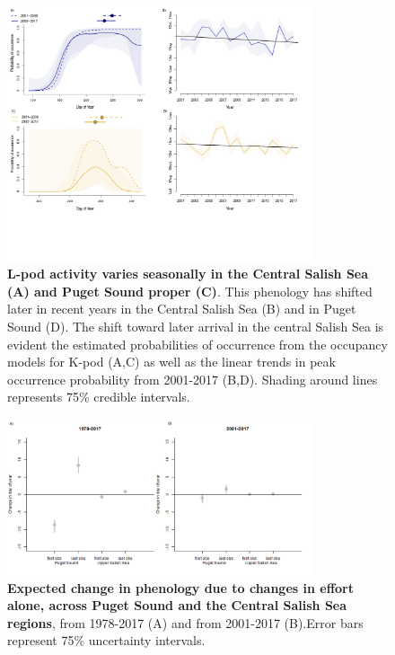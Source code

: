 \documentclass{article}
\begin{document}
\begin{figure}[ht]
\includegraphics[width=0.8\textwidth]{../analyses/figures/proboccL_4panels.png} 
\caption{\textbf{L-pod activity varies seasonally in the Central Salish Sea (A) and Puget Sound proper (C)}. This phenology has shifted later in recent years in the Central Salish Sea (B) and in Puget Sound (D). The shift toward later arrival in the central Salish Sea is evident the estimated probabilities of occurrence from the occupancy models for K-pod (A,C) as well as the linear trends in peak occurrence probability from 2001-2017 (B,D). Shading around lines represents 75\% credible intervals. 
}
\label{fig:Lprobs}
\end{figure}

\begin{figure}[ht]
\includegraphics[width=0.8\textwidth]{../analyses/orcaphen/figures/simeffortonly2panels.png} 
\caption{\textbf{Expected change in phenology due to changes in effort alone, across Puget Sound and the Central Salish Sea regions}, from 1978-2017 (A) and from 2001-2017 (B).Error bars represent 75\% uncertainty intervals. }
\label{fig:simeffort}
\end{figure}

\pagebreak
  
\end{document}
